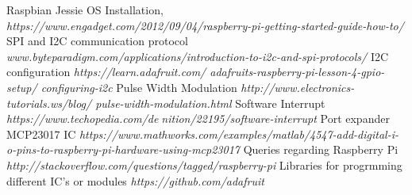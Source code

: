 \documentclass[a4paper,12pt,oneside]{book}
\begin{document}
\begin{thebibliography}{li}
Raspbian Jessie OS Installation,
{\em https://www.engadget.com/2012/09/04/raspberry-pi-getting-started-guide-how-to/}
SPI and I2C communication protocol
{\em www.byteparadigm.com/applications/introduction-to-i2c-and-spi-protocols/}
I2C configuration
{\em https://learn.adafruit.com/
adafruits-raspberry-pi-lesson-4-gpio-setup/
configuring-i2c}
Pulse Width Modulation
{\em http://www.electronics-tutorials.ws/blog/
pulse-width-modulation.html}
Software Interrupt
{\em https://www.techopedia.com/denition/22195/software-interrupt}
Port expander MCP23017 IC
{\em https://www.mathworks.com/examples/matlab/4547-add-digital-i-o-pins-to-raspberry-pi-hardware-using-mcp23017}
Queries regarding Raspberry Pi
{\em http://stackoverflow.com/questions/tagged/raspberry-pi}
Libraries for progrmming different IC's or modules
{\em https://github.com/adafruit}
\end{thebibliography}
\end{document}
